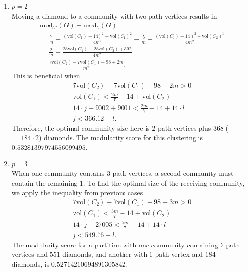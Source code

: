 \documentclass[letterpaper,12pt]{article}
\begin{document}
\begin{enumerate}
      \item $p = 2$\\
            Moving a diamond to a community with two path vertices results in
            \begin{align*}
                   & \text{mod}_{\mathcal{C'}}(G) - \text{mod}_{\mathcal{C}} (G)                                                                                       \\
                   & = \frac{7}{m} - \frac{(\text{vol}(C_1)+14)^2 - \text{vol}(C_1)^2}{4m^2} - \frac{5}{m} - \frac{(\text{vol}(C_2) - 14)^2 - \text{vol}(C_2)^2}{4m^2} \\
                   & = \frac{2}{m} - \frac{28\text{vol}(C_1) - 28\text{vol}(C_2) + 392}{4m^2}                                                                          \\
                   & = \frac{7\text{vol}(C_2) - 7\text{vol}(C_1) - 98 + 2m}{m^2}.
            \end{align*}
            This is beneficial when
            \begin{align*}
                   & 7\text{vol}(C_2) - 7\text{vol}(C_1) - 98 + 2m > 0         \\
                   & \text{vol}(C_1) < \frac{2m}{7} - 14 + \text{vol}(C_2)     \\
                   & 14 \cdot j + 9002 + 9001 < \frac{2m}{7} - 14 + 14 \cdot l \\
                   & j < 366.12 + l.
            \end{align*}
            Therefore, the optimal community size here is $2$ path vertices plus $368$ ($=184 \cdot 2$) diamonds. The modularity score for this clustering is $0.53281397974556099495$.

      \item $p = 3$\\
            When one community contains $3$ path vertices, a second community must contain the remaining $1$. To find the optimal size of the receiving community, we apply the inequality from previous cases
            \begin{align*}
                   & 7\text{vol}(C_2) - 7\text{vol}(C_1) - 98 + 3m > 0     \\
                   & \text{vol}(C_1) < \frac{3m}{7} - 14 + \text{vol}(C_2) \\
                   & 14 \cdot j + 27005 < \frac{3m}{7} - 14 + 14 \cdot l   \\
                   & j < 549.76 + l.
            \end{align*}
            The modularity score for a partition with one community containing $3$ path vertices and $551$ diamonds, and another with $1$ path vertex and $184$ diamonds, is $0.52714210694891305842$.


\end{enumerate}
\end{document}
